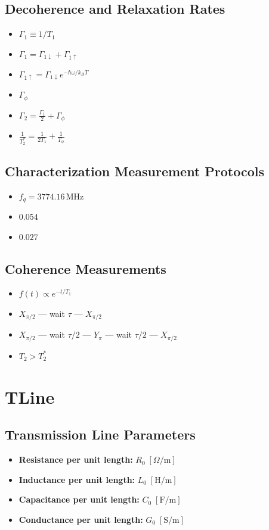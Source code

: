 \documentclass{article}
\begin{document}
\subsection*{Decoherence and Relaxation Rates}
\begin{itemize}
    \item $\Gamma_1 \equiv 1/T_1$
    \item $\Gamma_1 = \Gamma_{1\downarrow} + \Gamma_{1\uparrow}$
    \item $\Gamma_{1\uparrow} = \Gamma_{1\downarrow}e^{-\hbar\omega/k_B T}$
    \item $\Gamma_\phi$
    \item $\Gamma_2 = \frac{\Gamma_1}{2} + \Gamma_\phi$
    \item $\frac{1}{T_2^*} = \frac{1}{2T_1} + \frac{1}{T_\phi}$
\end{itemize}

\subsection*{Characterization Measurement Protocols}
\begin{itemize}
    \item $f_q = 3774.16\,\text{MHz}$
    \item $0.054$
    \item $0.027$
\end{itemize}

\subsection*{Coherence Measurements}
\begin{itemize}
    \item $f(t) \propto e^{-t/T_1}$
    \item $X_{\pi/2}$ --- wait $\tau$ --- $X_{\pi/2}$
    \item $X_{\pi/2}$ --- wait $\tau/2$ --- $Y_\pi$ --- wait $\tau/2$ --- $X_{\pi/2}$
    \item $T_2 > T_2^*$
\end{itemize}


\section{TLine}

\subsection*{Transmission Line Parameters}
\begin{itemize}
    \item \textbf{Resistance per unit length:} $R_0 \; [\Omega/\text{m}]$
    \item \textbf{Inductance per unit length:} $L_0 \; [\text{H}/\text{m}]$
    \item \textbf{Capacitance per unit length:} $C_0 \; [\text{F}/\text{m}]$
    \item \textbf{Conductance per unit length:} $G_0 \; [\text{S}/\text{m}]$
\end{itemize}
\end{document}

